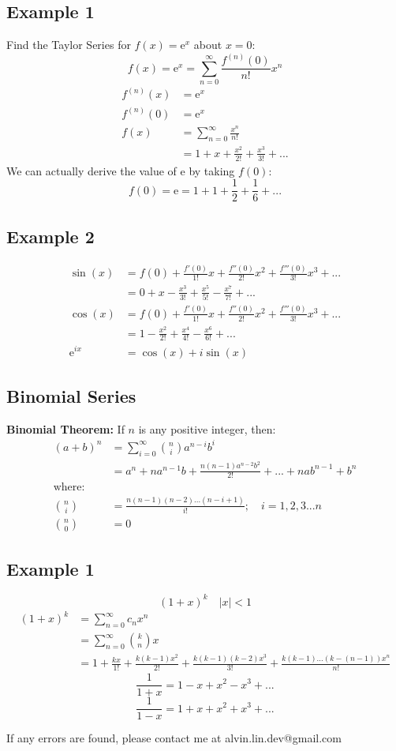 \documentclass[letterpaper, 12pt]{article}
\newcommand*{\e}{\mathrm{e}}
\begin{document}
\subsection*{Example 1}
Find the Taylor Series for \( f(x)= \e^{x} \) about \( x = 0 \):
\[ f(x) = \e^{x} = \sum_{n=0}^{\infty}\frac{f^{(n)}(0)}{n!}x^{n} \]
\begin{align*}
  f^{(n)}(x) &= \e^{x} \\
  f^{(n)}(0) &= \e^{x} \\
  f(x) &= \sum_{n=0}^{\infty}\frac{x^{n}}{n!} \\
  &= 1+x+\frac{x^{2}}{2!}+\frac{x^{3}}{3!}+...
\end{align*}
We can actually derive the value of \( \e \) by taking \( f(0) \):
\[ f(0) = \e = 1+1+\frac{1}{2}+\frac{1}{6}+... \]

\subsection*{Example 2}
\begin{align*}
  \sin(x) &= f(0)+\frac{f'(0)}{1!}x+\frac{f''(0)}{2!}x^{2}+
    \frac{f'''(0)}{3!}x^{3}+... \\
  &= 0+x-\frac{x^{3}}{3!}+\frac{x^{5}}{5!}-\frac{x^{7}}{7!}+... \\
  \cos(x) &= f(0)+\frac{f'(0)}{1!}x+\frac{f''(0)}{2!}x^{2}+
    \frac{f'''(0)}{3!}x^{3}+... \\
  &= 1-\frac{x^{2}}{2!}+\frac{x^{4}}{4!}-\frac{x^{6}}{6!}+... \\
  \e^{ix} &= \cos(x)+i\sin(x)
\end{align*}

\subsection*{Binomial Series}
\textbf{Binomial Theorem:} If \( n \) is any positive integer, then:
\begin{align*}
  (a+b)^{n} &= \sum_{i=0}^{\infty}\binom{n}{i}a^{n-i}b^{i} \\
  &= a^{n}+na^{n-1}b+\frac{n(n-1)a^{n-2}b^{2}}{2!}+...+nab^{n-1}+b^{n} \\
  \mathrm{where:} \\
  \binom{n}{i} &= \frac{n(n-1)(n-2)...(n-i+1)}{i!}; \quad i=1,2,3...n \\
  \binom{n}{0} &= 0
\end{align*}

\subsection*{Example 1}
\[ (1+x)^{k} \quad |x| < 1 \]
\begin{align*}
  (1+x)^{k} &= \sum_{n=0}^{\infty}c_{n}x^{n} \\
  &= \sum_{n=0}^{\infty}\binom{k}{n}x \\
  &= 1+\frac{kx}{1!}+\frac{k(k-1)x^{2}}{2!}+\frac{k(k-1)(k-2)x^{3}}{3!}
    +\frac{k(k-1)...(k-(n-1))x^{n}}{n!}
\end{align*}
\[ \frac{1}{1+x} = 1-x+x^{2}-x^{3}+... \]
\[ \frac{1}{1-x} = 1+x+x^{2}+x^{3}+... \]

\begin{center}
  If any errors are found, please contact me at alvin.lin.dev@gmail.com
\end{center}
\end{document}
